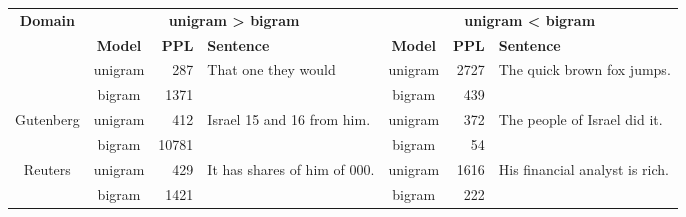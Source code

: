 \begin{tabular}{c||c|r|l||c|r|l}
  \multirow{2}{*}{\textbf{Domain}} & \multicolumn{3}{c||}{\textbf{unigram > bigram}} & \multicolumn{3}{c}{\textbf{unigram < bigram}} \\\cline{2-7}
  & \textbf{Model} & \textbf{PPL} & \textbf{Sentence} & \textbf{Model} & \textbf{PPL} & \textbf{Sentence}\\\hhline{=||=|=|=||=|=|=}
  \multirow{2}{*}{Brown} & unigram & 287 & \multirow{2}{*}{That one they would} & unigram & 2727 & \multirow{2}{*}{The quick brown fox jumps.} \\
                         & bigram  & 1371 &                                     & bigram  & 439 & \\\hline
  \multirow{2}{*}{Gutenberg} & unigram & 412 & \multirow{2}{*}{Israel 15 and 16 from him.} & unigram & 372 & \multirow{2}{*}{The people of Israel did it.} \\
                         & bigram  & 10781 &                                     & bigram  & 54 & \\\hline
  \multirow{2}{*}{Reuters} & unigram & 429 & \multirow{2}{*}{It has shares of him of 000.} & unigram & 1616 & \multirow{2}{*}{His financial analyst is rich.} \\
                         & bigram  & 1421 &                                     & bigram  & 222 & \\
\end{tabular}
